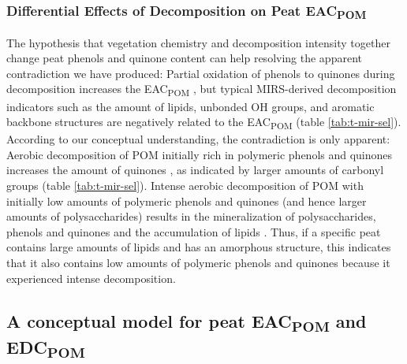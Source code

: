 \documentclass[alpha-refs]{wiley-article-rmd}
\begin{document}
\begin{refsection}
\hypertarget{differential-effects-of-decomposition-on-peat-eac}{%
\subsubsection{\texorpdfstring{Differential Effects of Decomposition on Peat EAC\textsubscript{POM}}{Differential Effects of Decomposition on Peat EAC}}\label{differential-effects-of-decomposition-on-peat-eac}}

The hypothesis that vegetation chemistry and decomposition intensity together change peat phenols and quinone content can help resolving the apparent contradiction we have produced: Partial oxidation of phenols to quinones during decomposition increases the EAC\textsubscript{POM} \autocite{Aeschbacher.2012,Walpen.2018,Tan.2017}, but typical MIRS-derived decomposition indicators such as the amount of lipids, unbonded OH groups, and aromatic backbone structures \autocite{Cocozza.2003,Artz.2008} are negatively related to the EAC\textsubscript{POM} (table \ref{tab:t-mir-sel}). According to our conceptual understanding, the contradiction is only apparent: Aerobic decomposition of POM initially rich in polymeric phenols and quinones increases the amount of quinones \autocite{Aeschbacher.2012}, as indicated by larger amounts of carbonyl groups (table \ref{tab:t-mir-sel}). Intense aerobic decomposition of POM with initially low amounts of polymeric phenols and quinones (and hence larger amounts of polysaccharides) results in the mineralization of polysaccharides, phenols and quinones and the accumulation of lipids \autocite{Fenner.2011,Leifeld.2012}. Thus, if a specific peat contains large amounts of lipids and has an amorphous structure, this indicates that it also contains low amounts of polymeric phenols and quinones because it experienced intense decomposition.

\hypertarget{a-conceptual-model-for-peat-eac-and-edc}{%
\subsection{\texorpdfstring{A conceptual model for peat EAC\textsubscript{POM} and EDC\textsubscript{POM}}{A conceptual model for peat EAC and EDC}}\label{a-conceptual-model-for-peat-eac-and-edc}}


\end{refsection}
\end{document}
